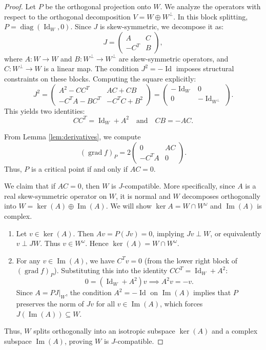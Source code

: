 \documentclass[12pt, final]{article}
\def\diag{\operatorname{diag}}
\def\Im{\operatorname{Im}}
\def\grad{\operatorname{grad}}
\def\Id{\operatorname{Id}}
\begin{document}
\begin{proof}
Let $P$ be the orthogonal projection onto $W$. We analyze the operators with respect to the orthogonal decomposition $V = W \oplus W^\perp$. In this block splitting, $P = \diag(\Id_W, 0)$. Since $J$ is skew-symmetric, we decompose it as:
\[
J = \begin{pmatrix} A & C \\ -C^T & B \end{pmatrix},
\]
where $A: W \to W$ and $B: W^\perp \to W^\perp$ are skew-symmetric operators, and $C: W^\perp \to W$ is a linear map.
The condition $J^2 = -\Id$ imposes structural constraints on these blocks. Computing the square explicitly:
\[
J^2 = \begin{pmatrix} A^2 - CC^T & AC + CB \\ -C^T A - B C^T & -C^T C + B^2 \end{pmatrix} = \begin{pmatrix} -\Id_W & 0 \\ 0 & -\Id_{W^\perp} \end{pmatrix}.
\]
This yields two identities:
\begin{equation} \label{eq:J2_identities}
C C^T = \Id_W + A^2 \quad \text{and} \quad CB = -AC.
\end{equation}

From Lemma \ref{lem:derivatives}, we compute
\[
(\grad f)_P = 2 \begin{pmatrix} 0 & AC \\ -C^T A & 0 \end{pmatrix}.
\]
Thus, $P$ is a critical point if and only if $AC = 0$.

We claim that if $AC = 0$, then $W$ is $J$-compatible. More specifically, since $A$ is a real skew-symmetric operator on $W$, it is normal and $W$ decomposes orthogonally into $W = \ker(A) \oplus \Im(A)$. We will show $\ker A = W \cap W^\omega$ and $\Im(A)$ is complex.
\begin{enumerate}
    \item Let $v \in \ker(A)$. Then $Av = P(Jv) = 0$, implying $Jv \perp W$, or equivalently $v \perp JW$. Thus $v \in W^\omega$. Hence $\ker(A) = W \cap W^\omega$.
    \item  For any $v \in \Im(A)$, we have $C^T v = 0$ (from the lower right block of $(\grad f)_P$). Substituting this into the identity $CC^T = \Id_W + A^2$:
    \[ 0 = (\Id_W + A^2)v \implies A^2 v = -v. \]
    Since $A = P J|_W$, the condition $A^2 = -\Id$ on $\Im(A)$ implies that $P$ preserves the norm of $Jv$ for all $v \in \Im(A)$, which forces $J(\Im(A)) \subseteq W$.
\end{enumerate}
Thus, $W$ splits orthogonally into an isotropic subspace $\ker(A)$ and a complex subspace $\Im(A)$, proving $W$ is $J$-compatible.
\end{proof}
\end{document}
